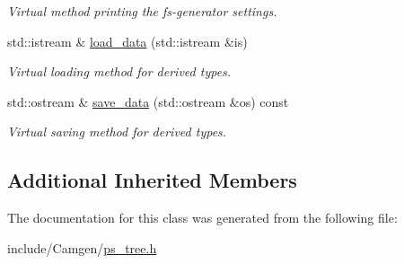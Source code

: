 \begin{DoxyCompactItemize}
\begin{DoxyCompactList}\small\item\em Virtual method printing the fs-\/generator settings. \end{DoxyCompactList}\item 
\hypertarget{a00446_aa47039c6069a04cb560300a608227196}{std\-::istream \& \hyperlink{a00446_aa47039c6069a04cb560300a608227196}{load\-\_\-data} (std\-::istream \&is)}\label{a00446_aa47039c6069a04cb560300a608227196}

\begin{DoxyCompactList}\small\item\em Virtual loading method for derived types. \end{DoxyCompactList}\item 
\hypertarget{a00446_a252ecd0b58cbb963172e5caae7e85b73}{std\-::ostream \& \hyperlink{a00446_a252ecd0b58cbb963172e5caae7e85b73}{save\-\_\-data} (std\-::ostream \&os) const }\label{a00446_a252ecd0b58cbb963172e5caae7e85b73}

\begin{DoxyCompactList}\small\item\em Virtual saving method for derived types. \end{DoxyCompactList}\end{DoxyCompactItemize}
\subsection*{Additional Inherited Members}


The documentation for this class was generated from the following file\-:\begin{DoxyCompactItemize}
\item 
include/\-Camgen/\hyperlink{a00718}{ps\-\_\-tree.\-h}\end{DoxyCompactItemize}
